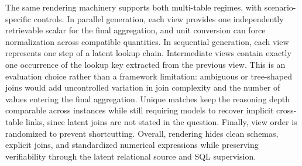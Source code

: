 The same rendering machinery supports both multi-table regimes, with scenario-specific controls. In parallel generation, each view provides one independently retrievable scalar for the final aggregation, and unit conversion can force normalization across compatible quantities. In sequential generation, each view represents one step of a latent lookup chain. Intermediate views contain exactly one occurrence of the lookup key extracted from the previous view. This is an evaluation choice rather than a framework limitation: ambiguous or tree-shaped joins would add uncontrolled variation in join complexity and the number of values entering the final aggregation. Unique matches keep the reasoning depth comparable across instances while still requiring models to recover implicit cross-table links, since latent joins are not stated in the question. Finally, view order is randomized to prevent shortcutting. 
Overall, rendering hides clean schemas, explicit joins, and standardized numerical expressions while preserving verifiability through the latent relational source and SQL supervision.
